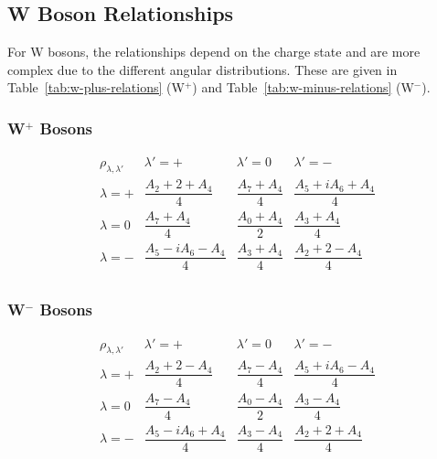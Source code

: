 \documentclass[11pt]{article}
\begin{document}
\subsection{W Boson Relationships}

For W bosons, the relationships depend on the charge state and are more complex due to the different angular distributions. These are given in Table~\ref{tab:w-plus-relations} (W$^+$) and Table~\ref{tab:w-minus-relations} (W$^-$).

\subsubsection{W$^+$ Bosons}

\begin{table}[htbp]
    \centering
    \caption{Relationships between W$^+$ boson helicity density matrix elements and angular coefficients in the Collins-Soper frame.}
    \label{tab:w-plus-relations}
    \[
    \begin{array}{c|ccc}
        \rho_{\lambda,\lambda'} & \lambda' = + & \lambda' = 0 & \lambda' = - \\
        \hline
        \lambda = + & \dfrac{A_2 + 2 + A_4}{4} & \dfrac{A_7 + A_4}{4} & \dfrac{A_5 + iA_6 + A_4}{4} \\
        \lambda = 0 & \dfrac{A_7 + A_4}{4} & \dfrac{A_0 + A_4}{2} & \dfrac{A_3 + A_4}{4} \\
        \lambda = - & \dfrac{A_5 - iA_6 - A_4}{4} & \dfrac{A_3 + A_4}{4} & \dfrac{A_2 + 2 - A_4}{4} \\
    \end{array}
    \]
\end{table}

\subsubsection{W$^-$ Bosons}

\begin{table}[htbp]
    \centering
    \caption{Relationships between W$^-$ boson helicity density matrix elements and angular coefficients in the Collins-Soper frame.}
    \label{tab:w-minus-relations}
    \[
    \begin{array}{c|ccc}
        \rho_{\lambda,\lambda'} & \lambda' = + & \lambda' = 0 & \lambda' = - \\
        \hline
        \lambda = + & \dfrac{A_2 + 2 - A_4}{4} & \dfrac{A_7 - A_4}{4} & \dfrac{A_5 + iA_6 - A_4}{4} \\
        \lambda = 0 & \dfrac{A_7 - A_4}{4} & \dfrac{A_0 - A_4}{2} & \dfrac{A_3 - A_4}{4} \\
        \lambda = - & \dfrac{A_5 - iA_6 + A_4}{4} & \dfrac{A_3 - A_4}{4} & \dfrac{A_2 + 2 + A_4}{4} \\
    \end{array}
    \]
\end{table}
\end{document}
